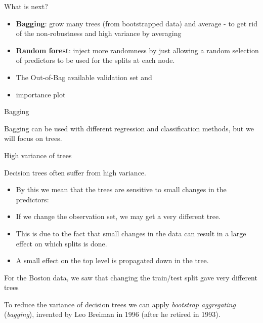 \documentclass[
  ignorenonframetext,
]{beamer}
\providecommand{\tightlist}{%
  \setlength{\itemsep}{0pt}\setlength{\parskip}{0pt}}
\begin{document}
\begin{frame}

\begin{block}{What is next?}

\begin{itemize}
\tightlist
\item
  \textbf{Bagging}: grow many trees (from bootstrapped data) and average
  - to get rid of the non-robustness and high variance by averaging
\item
  \textbf{Random forest}: inject more randomness by just allowing a
  random selection of predictors to be used for the splits at each node.
\item
  The Out-of-Bag available validation set and
\item
  importance plot
\end{itemize}

\end{block}

\end{frame}

\begin{frame}{Bagging}
\protect\hypertarget{bagging}{}

Bagging can be used with different regression and classification
methods, but we will focus on trees.

\begin{block}{High variance of trees}

Decision trees often suffer from high variance.

\begin{itemize}
\tightlist
\item
  By this we mean that the trees are sensitive to small changes in the
  predictors:
\item
  If we change the observation set, we may get a very different tree.
\item
  This is due to the fact that small changes in the data can result in a
  large effect on which splits is done.
\item
  A small effect on the top level is propagated down in the tree.
\end{itemize}

For the Boston data, we saw that changing the train/test split gave very
different trees

To reduce the variance of decision trees we can apply \emph{bootstrap
aggregating} (\emph{bagging}), invented by Leo Breiman in 1996 (after he
retired in 1993).

\end{block}

\end{frame}
\end{document}
